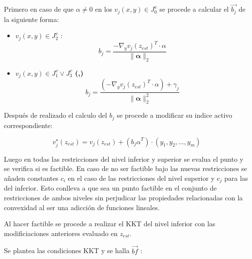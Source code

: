 Primero en caso de que $\alpha \neq 0$ en los $v_j(x,y) \in J_0^v$ se procede a calcular el $\vec{b_j}$ de la siguiente forma:

\begin{itemize}
    \item \textbf{ $v_j(x,y) \in J_2^v$ }:
        \begin{equation}
            b_j=  \frac{-\nabla_{y}{v_j(z_{est})}^T \cdot \alpha}{\|\mathbf{\alpha} \|_2}
        \end{equation}
    \item \textbf{$v_j(x,y) \in J_1^v \lor J_3^v$ (,)}\\
    \begin{equation}
        b_j=  \frac{(-\nabla_{y}{v_j(z_{est})}^T \cdot \alpha)+\gamma_j}{\|\mathbf{\alpha} \|_2^2}
    \end{equation}
\end{itemize}


Después de realizado el calculo del $b_j$ se procede a modificar su indice activo correspondiente:

\begin{equation}
	v_{j}^{\star}(z_{est})=v_{j}(z_{est})+ ({b_j\alpha}^T)\cdot (y_1,y_2,\dots,y_m)
\end{equation}


Luego en todas las restricciones del nivel inferior y superior
se evalua el punto y se verifica si es factible. En caso de no ser factible 
bajo las nuevas restricciones se añaden constantes $c_i$ en el caso de las restricciones del
nivel superior y $c_j$ para las del inferior. Esto conlleva a que sea un punto factible en el conjunto
de restricciones de ambos niveles sin perjudicar las propiedades relacionadas con la convexidad al ser una adicción
de funciones lineales. 

Al hacer factible se procede a realizar el KKT del nivel inferior con las modificiaciones anteriores evaluado en $z_{est}$.

Se plantea las condiciones KKT y se halla $\vec{bf}$ :

